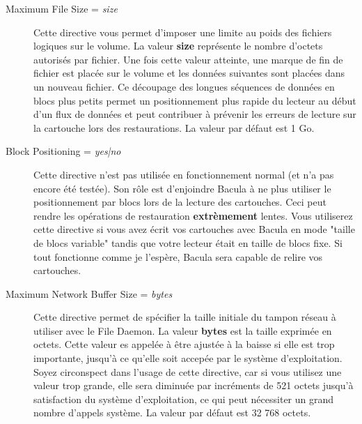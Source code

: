 \begin{description}
\item [Maximum File Size = {\it size}]
   Cette directive vous permet d'imposer une limite au poids des fichiers logiques 
   sur le volume. La valeur {\bf size} repr\'esente le nombre d'octets autoris\'es 
   par fichier. Une fois cette valeur atteinte, une marque de fin de fichier est 
   plac\'ee sur le volume et les donn\'ees suivantes sont plac\'ees dans un nouveau 
   fichier. Ce d\'ecoupage des longues s\'equences de donn\'ees en blocs plus petits 
   permet un positionnement plus rapide du lecteur au d\'ebut d'un flux de donn\'ees 
   et peut contribuer \`a pr\'evenir les erreurs de lecture sur la cartouche lors des 
   restaurations. La valeur par d\'efaut est 1 Go.
   
\item [Block Positioning = {\it yes|no}]
   Cette directive n'est pas utilis\'ee en fonctionnement normal (et n'a pas encore 
   \'et\'e test\'ee). Son r\^ole est d'enjoindre Bacula \`a ne plus utiliser le 
   positionnement par blocs lors de la lecture des cartouches. Ceci peut rendre 
   les op\'erations de restauration {\bf extr\`emement} lentes. Vous utiliserez cette 
   directive si vous avez \'ecrit vos cartouches avec Bacula en mode "taille de blocs 
   variable" tandis que votre lecteur \'etait en taille de blocs fixe. Si tout 
   fonctionne comme je l'esp\`ere, Bacula sera capable de relire vos cartouches.

\item [Maximum Network Buffer Size = {\it bytes}]
   Cette directive permet de sp\'ecifier la taille initiale du tampon r\'eseau \`a 
   utiliser avec le File Daemon. La valeur {\bf bytes} est la taille exprim\'ee 
   en octets. Cette valeur es appel\'ee \`a \^etre ajust\'ee \`a la baisse si elle est 
   trop importante, jusqu'\`a ce qu'elle soit accep\'ee par le syst\`eme d'exploitation. 
   Soyez circonspect dans l'usage de cette directive, car si vous utilisez une 
   valeur trop grande, elle sera diminu\'ee par incr\'ements de 521 octets jusqu'\`a 
   satisfaction du syst\`eme d'exploitation, ce qui peut n\'ecessiter un grand nombre 
   d'appels syst\`eme. La valeur par d\'efaut est 32 768 octets.


\end{description}
